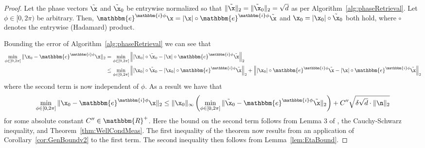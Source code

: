 \begin{proof}

Let the phase vectors $\tilde{\x}$ and $\tilde{\x}_0$ be entrywise normalized so that $\| \tilde{\x} \|_2 = \| \tilde{\x}_0 \|_2 = \sqrt{d}$ as per Algorithm~\ref{alg:phaseRetrieval}.  Let $\phi \in [0,2 \pi)$ be arbitrary.  %
Then, $\mathbbm{e}^{\mathbbm{i} \phi }\x = |\x| \circ \mathbbm{e}^{\mathbbm{i} \phi} \tilde{\x}$ and $\x_0 = |\x_0| \circ \tilde{\x}_0$ both hold, where $\circ$ denotes the entrywise (Hadamard) product. 

Bounding the error of Algorithm~\ref{alg:phaseRetrieval} we can see that
\begin{align*}
\min_{\phi \in [0, 2 \pi]} \| \x_0 - \mathbbm{e}^{\mathbbm{i} \phi }\x \|_2 &= \min_{\phi \in [0, 2 \pi]} \left\| |\x_0| \circ \tilde{\x}_0 - |\x| \circ \mathbbm{e}^{\mathbbm{i} \phi} \tilde{\x} \right\|_2 \\
&\leq \min_{\phi \in [0, 2 \pi]} \left\| |\x_0| \circ \tilde{\x}_0 - |\x_0| \circ \mathbbm{e}^{\mathbbm{i} \phi} \tilde{\x}  \right\|_2 + \left\| |\x_0| \circ \mathbbm{e}^{\mathbbm{i} \phi} \tilde{\x}  - |\x| \circ \mathbbm{e}^{\mathbbm{i} \phi} \tilde{\x}  \right\|_2 
\end{align*}
where the second term is now independent of $\phi$.  As a result we have that
\begin{equation*}
\min_{\phi \in [0, 2 \pi]} \| \x_0 - \mathbbm{e}^{\mathbbm{i} \phi }\x \|_2 \leq \| \x_0 \|_{\infty} \left( \min_{\phi \in [0, 2 \pi]} \| \tilde{\x}_0 - \mathbbm{e}^{\mathbbm{i} \phi} \tilde{\x} \|_2 \right) + C'' \sqrt{\delta \sqrt{d} \cdot \| \n \|_2 }
\end{equation*}
for some absolute constant $C'' \in \mathbbm{R}^+$.  Here the bound on the second term follows from Lemma 3 of \cite{IVW2015_FastPhase}, the Cauchy-Schwarz inequality, and Theorem~\ref{thm:WellCondMeas}.  %
%
%
The first inequality of the theorem now results from an application of Corollary~\ref{cor:GenBoundv2} to the first term.  The second inequality then follows from Lemma~\ref{lem:EtaBound}.
\end{proof}

